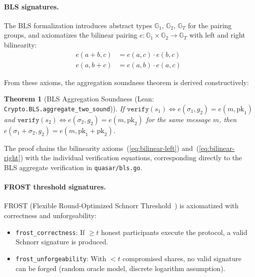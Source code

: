 \documentclass[11pt,a4paper]{article}
\newtheorem{theorem}{Theorem}[section]
\begin{document}
\paragraph{BLS signatures.}
The BLS formalization introduces abstract types $\mathbb{G}_1$, $\mathbb{G}_2$, $\mathbb{G}_T$ for the
pairing groups, and axiomatizes the bilinear pairing $e : \mathbb{G}_1 \times \mathbb{G}_2 \to \mathbb{G}_T$
with left and right bilinearity:
\begin{align}
e(a + b, c) &= e(a, c) \cdot e(b, c) \label{eq:bilinear-left} \\
e(a, b + c) &= e(a, b) \cdot e(a, c) \label{eq:bilinear-right}
\end{align}

From these axioms, the aggregation soundness theorem is derived constructively:

\begin{theorem}[BLS Aggregation Soundness (Lean: \texttt{Crypto.BLS.aggregate\_two\_sound})]
\label{thm:formal-bls}
If $\texttt{verify}(s_1) \Leftrightarrow e(\sigma_1, g_2) = e(m, \text{pk}_1)$ and
$\texttt{verify}(s_2) \Leftrightarrow e(\sigma_2, g_2) = e(m, \text{pk}_2)$ for the same
message $m$, then
$e(\sigma_1 + \sigma_2, g_2) = e(m, \text{pk}_1 + \text{pk}_2)$.
\end{theorem}

The proof chains the bilinearity axioms~(\ref{eq:bilinear-left}) and~(\ref{eq:bilinear-right})
with the individual verification equations, corresponding directly to the BLS aggregate
verification in \texttt{quasar/bls.go}.

\paragraph{FROST threshold signatures.}
FROST (Flexible Round-Optimized Schnorr Threshold~\cite{komlo2020frost}) is axiomatized
with correctness and unforgeability:
\begin{itemize}[nosep]
\item \texttt{frost\_correctness}: If $\geq t$ honest participants execute the protocol,
a valid Schnorr signature is produced.
\item \texttt{frost\_unforgeability}: With $< t$ compromised shares, no valid signature
can be forged (random oracle model, discrete logarithm assumption).
\end{itemize}
\end{document}
